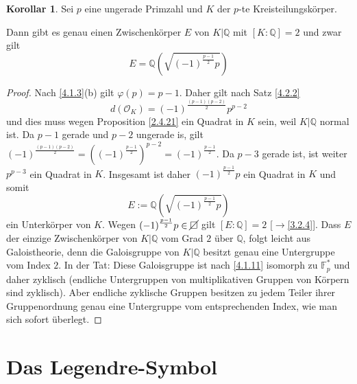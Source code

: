 \documentclass[
twoside=semi,
fontsize=12,
DIV=12, 
cleardoublepage=current,
leqno,
headings=optiontoheadandtoc, 
toc=idx
]{scrbook}
\newcommand{\Q}{\mathbb{Q}}
\newcommand{\F}{\mathbb{F}}
\newcommand{\nsquare}{\cancel{\square}}
\newcommand{\brac}[1]{\left( #1 \right)}
\theoremstyle{definition}
\newtheorem{korollar}[definition]{Korollar}
\begin{document}
 	\begin{korollar}\label{4.2.3}\hfill\newline
 		Sei $p$ eine ungerade Primzahl und $K$ der $p$-te Kreisteilungsk\"orper. 
 		
 		\medskip\noindent
 		Dann gibt es genau einen Zwischenk\"orper $E$ von $K|\Q$ mit $[K:\Q] = 2$ und zwar gilt 
 			\[E=\Q\brac{\sqrt{(-1)^{\frac{p-1}{2}} p}}\]
 		
 		\begin{proof}
 			Nach \ref{4.1.3}(b) gilt $\varphi(p) = p - 1$. Daher gilt nach Satz \ref{4.2.2}
 				\[d(\mathcal{O}_K) = (-1)^{\frac{(p-1)(p-2)}{2}}p^{p-2} \]
 			und dies muss wegen Proposition \ref{2.4.21} ein Quadrat in $K$ sein, weil $K|\Q$ normal ist. Da $p-1$ gerade und $p-2$ ungerade is, gilt $(-1)^{\frac{(p-1)(p-2)}{2}} = ((-1)^{\frac{p-1}{2}})^{p-2} = (-1)^{\frac{p-1}{2}}$. Da $p-3$ gerade ist, ist weiter $p^{p-3}$ ein Quadrat in $K$. Insgesamt ist daher $(-1)^{\frac{p-1}{2}}p$ ein Quadrat in $K$ und somit 
 				\[E:= \Q\brac{\sqrt{(-1)^{\frac{p-1}{2}}p }}\]
 			ein Unterk\"orper von $K$. Wegen $(-1)^{\frac{p-1}{2}}p \in \nsquare$ gilt $[E:\Q] = 2$ [$\to$\ref{3.2.4}]. Dass $E$ der einzige Zwischenk\"orper von $K|\Q$ vom Grad $2$ \"uber $\Q$, folgt 
 			leicht aus Galoistheorie, denn die Galoisgruppe von $K|\Q$ besitzt genau eine Untergruppe vom Index $2$. In der Tat: Diese Galoisgruppe ist  nach \ref{4.1.11} isomorph zu $\F_p^*$ und daher 
 			zyklisch (endliche Untergruppen von multiplikativen Gruppen von K\"orpern sind zyklisch). Aber endliche zyklische Gruppen besitzen zu jedem Teiler ihrer Gruppenordnung genau eine Untergruppe vom entsprechenden Index, wie man sich sofort \"uberlegt.
 		\end{proof}
 	\end{korollar}
 
 
 	
 	\newpage
 	\section{Das Legendre-Symbol}\thispagestyle{sectionstart}
\backmatter
\printindex
\end{document}
